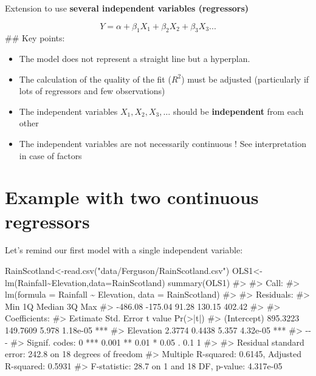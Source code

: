 \documentclass[
  letterpaper,
  DIV=11,
  numbers=noendperiod]{scrreprt}
\newenvironment{Shaded}{\begin{snugshade}}{\end{snugshade}}
\newcommand{\AttributeTok}[1]{\textcolor[rgb]{0.40,0.45,0.13}{#1}}
\newcommand{\CommentTok}[1]{\textcolor[rgb]{0.37,0.37,0.37}{#1}}
\newcommand{\FunctionTok}[1]{\textcolor[rgb]{0.28,0.35,0.67}{#1}}
\newcommand{\NormalTok}[1]{\textcolor[rgb]{0.00,0.23,0.31}{#1}}
\newcommand{\OtherTok}[1]{\textcolor[rgb]{0.00,0.23,0.31}{#1}}
\newcommand{\SpecialCharTok}[1]{\textcolor[rgb]{0.37,0.37,0.37}{#1}}
\newcommand{\StringTok}[1]{\textcolor[rgb]{0.13,0.47,0.30}{#1}}
\begin{document}
Extension to use \textbf{several independent variables (regressors)}

\[Y = \alpha + \beta_1 X_1 + \beta_2 X_2 + \beta_3 X_3 ...\] \#\# Key
points:

\begin{itemize}
\item
  The model does not represent a straight line but a hyperplan.
\item
  The calculation of the quality of the fit (\(R^2\)) must be adjusted
  (particularly if lots of regressors and few observations)
\item
  The independent variables \(X_1,X_2, X_3,…\) should be
  \textbf{independent} from each other
\item
  The independent variables are not necessarily continuous ! See
  interpretation in case of factors
\end{itemize}

\section{Example with two continuous
regressors}\label{example-with-two-continuous-regressors}

Let's remind our first model with a single independent variable:

\begin{Shaded}
\begin{Highlighting}[]
\NormalTok{RainScotland}\OtherTok{\textless{}{-}}\FunctionTok{read.csv}\NormalTok{(}\StringTok{"data/Ferguson/RainScotland.csv"}\NormalTok{)}
\NormalTok{OLS1}\OtherTok{\textless{}{-}}\FunctionTok{lm}\NormalTok{(Rainfall}\SpecialCharTok{\textasciitilde{}}\NormalTok{Elevation,}\AttributeTok{data=}\NormalTok{RainScotland)}
\FunctionTok{summary}\NormalTok{(OLS1)}
\CommentTok{\#\textgreater{} }
\CommentTok{\#\textgreater{} Call:}
\CommentTok{\#\textgreater{} lm(formula = Rainfall \textasciitilde{} Elevation, data = RainScotland)}
\CommentTok{\#\textgreater{} }
\CommentTok{\#\textgreater{} Residuals:}
\CommentTok{\#\textgreater{}     Min      1Q  Median      3Q     Max }
\CommentTok{\#\textgreater{} {-}486.08 {-}175.04   91.28  130.15  402.42 }
\CommentTok{\#\textgreater{} }
\CommentTok{\#\textgreater{} Coefficients:}
\CommentTok{\#\textgreater{}             Estimate Std. Error t value Pr(\textgreater{}|t|)    }
\CommentTok{\#\textgreater{} (Intercept) 895.3223   149.7609   5.978 1.18e{-}05 ***}
\CommentTok{\#\textgreater{} Elevation     2.3774     0.4438   5.357 4.32e{-}05 ***}
\CommentTok{\#\textgreater{} {-}{-}{-}}
\CommentTok{\#\textgreater{} Signif. codes:  0 \textquotesingle{}***\textquotesingle{} 0.001 \textquotesingle{}**\textquotesingle{} 0.01 \textquotesingle{}*\textquotesingle{} 0.05 \textquotesingle{}.\textquotesingle{} 0.1 \textquotesingle{} \textquotesingle{} 1}
\CommentTok{\#\textgreater{} }
\CommentTok{\#\textgreater{} Residual standard error: 242.8 on 18 degrees of freedom}
\CommentTok{\#\textgreater{} Multiple R{-}squared:  0.6145, Adjusted R{-}squared:  0.5931 }
\CommentTok{\#\textgreater{} F{-}statistic:  28.7 on 1 and 18 DF,  p{-}value: 4.317e{-}05}
\end{Highlighting}
\end{Shaded}
\end{document}
